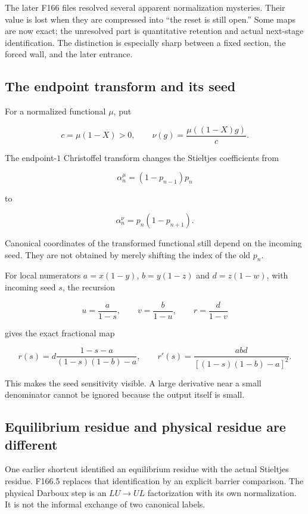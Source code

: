 \documentclass[
  10pt,
  a4paper,
  10pt,
  oneside,
  openany]{book}
\begin{document}
The later F166 files resolved several apparent normalization mysteries.
Their value is lost when they are compressed into ``the reset is still
open.'' Some maps are now exact; the unresolved part is quantitative
retention and actual next-stage identification. The distinction is
especially sharp between a fixed section, the forced wall, and the later
entrance.

\subsection{The endpoint transform and its
seed}\label{the-endpoint-transform-and-its-seed}

For a normalized functional \(\mu\), put

\[
 c=\mu(1-X)>0,\qquad
 \nu(g)=\frac{\mu((1-X)g)}c.
 \tag{37.1}\label{eq:37.1}
\]

The endpoint-\(1\) Christoffel transform changes the Stieltjes
coefficients from

\[
 \alpha_n^\mu=(1-p_{n-1})p_n
\]

to

\[
 \alpha_n^\nu=p_n(1-p_{n+1}).
 \tag{37.2}\label{eq:37.2}
\]

Canonical coordinates of the transformed functional still depend on the
incoming seed. They are not obtained by merely shifting the index of the
old \(p_n\).

For local numerators \(a=x(1-y)\), \(b=y(1-z)\) and \(d=z(1-w)\), with
incoming seed \(s\), the recursion

\[
 u=\frac a{1-s},\qquad v=\frac b{1-u},\qquad r=\frac d{1-v}
\]

gives the exact fractional map

\[
 r(s)=d\frac{1-s-a}{(1-s)(1-b)-a},\qquad
 r'(s)=\frac{abd}{[(1-s)(1-b)-a]^2}.
 \tag{37.3}\label{eq:37.3}
\]

This makes the seed sensitivity visible. A large derivative near a small
denominator cannot be ignored because the output itself is small.

\subsection{Equilibrium residue and physical residue are
different}\label{equilibrium-residue-and-physical-residue-are-different}

One earlier shortcut identified an equilibrium residue with the actual
Stieltjes residue. F166.5 replaces that identification by an explicit
barrier comparison. The physical Darboux step is an \(LU\to UL\)
factorization with its own normalization. It is not the informal
exchange of two canonical labels.
\end{document}
